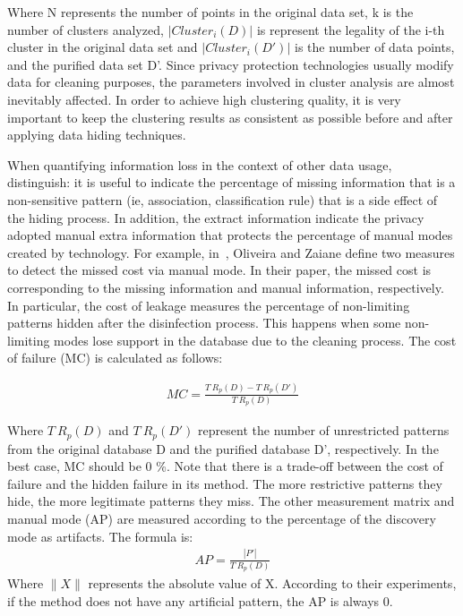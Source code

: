 \documentclass[journal,transmag]{IEEEtran}
\begin{document}
Where N represents the number of points in the original data set, k is the number of clusters analyzed,  $|Cluster_i(D)|$ is represent the legality of the i-th cluster in the original data set and $|Cluster_i(D')|$  is the number of data points, and the purified data set D'. Since privacy protection technologies usually modify data for cleaning purposes, the parameters involved in cluster analysis are almost inevitably affected. In order to achieve high clustering quality, it is very important to keep the clustering results as consistent as possible before and after applying data hiding techniques.

When quantifying information loss in the context of other data usage, distinguish: it is useful to indicate the percentage of missing information that is a non-sensitive pattern (ie, association, classification rule) that is a side effect of the hiding process. In addition, the extract information indicate the privacy adopted manual extra information that protects the percentage of manual modes created by technology. For example, in~\cite{oliveira2002privacy}, Oliveira and Zaiane define two measures to detect the missed cost via manual mode. In their paper, the missed cost is corresponding to the missing information and manual information, respectively. In particular, the cost of leakage measures the percentage of non-limiting patterns hidden after the disinfection process. This happens when some non-limiting modes lose support in the database due to the cleaning process. The cost of failure (MC) is calculated as follows:

\begin{eqnarray}\label{equ:MCdet}
MC = \frac{T~R_p(D)-T~R_p(D')}{T~R_p(D)}
\end{eqnarray}

Where $T~R_p(D)$ and $T~R_p(D')$ represent the number of unrestricted patterns from the original database D and the purified database D', respectively. In the best case, MC should be 0 \%. Note that there is a trade-off between the cost of failure and the hidden failure in its method. The more restrictive patterns they hide, the more legitimate patterns they miss. The other measurement matrix and manual mode (AP) are measured according to the percentage of the discovery mode as artifacts. The formula is:
\begin{eqnarray}\label{equ:APdet}
AP = \frac{|P'|}{T~R_p (D)}
\end{eqnarray}
Where $\|X\|$ represents the absolute value of X. According to their experiments, if the method does not have any artificial pattern, the AP is always 0.
\end{document}

